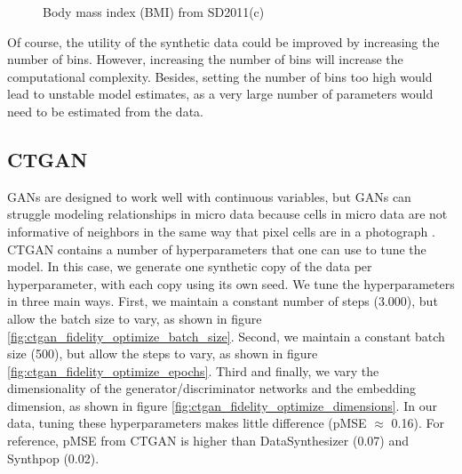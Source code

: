 \documentclass[runningheads]{llncs}
\begin{document}
\begin{figure}[ht!]
    \centering        
    \caption{Body mass index (BMI) from SD2011(c)}
    \label{fig:compare_ds_bmi}
\end{figure}

Of course, the utility of the synthetic data could be improved by increasing the number of bins. However, increasing the number of bins will increase the computational complexity. Besides, setting the number of bins too high would lead to unstable model estimates, as a very large number of parameters would need to be estimated from the data. 

\subsection{CTGAN} 

GANs are designed to work well with continuous variables, but GANs can struggle modeling relationships in micro data because cells in micro data are not informative of neighbors in the same way that pixel cells are in a photograph \cite{drechsler202330}.  CTGAN contains a number of hyperparameters that one can use to tune the model.  In this case, we generate one synthetic copy of the data per hyperparameter, with each copy using its own seed.  We tune the hyperparameters in three main ways.  First, we maintain a constant number of steps (3.000), but allow the batch size to vary, as shown in figure \ref{fig:ctgan_fidelity_optimize_batch_size}.  Second, we maintain a constant batch size (500), but allow the steps to vary, as shown in figure \ref{fig:ctgan_fidelity_optimize_epochs}.  Third and finally, we vary the dimensionality of the generator/discriminator networks and the embedding dimension, as shown in figure \ref{fig:ctgan_fidelity_optimize_dimensions}.  In our data, tuning these hyperparameters makes little difference (pMSE $\approx$ 0.16).  For reference, pMSE from CTGAN is higher than DataSynthesizer (0.07) and Synthpop (0.02).
\end{document}
